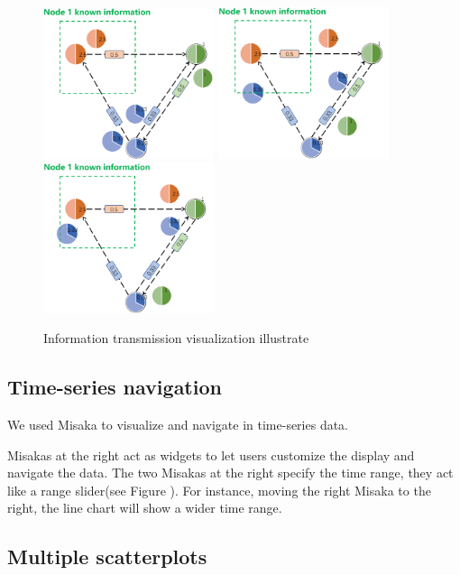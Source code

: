 \documentclass[conference]{IEEEtran}
\begin{document}
\begin{figure}[ht]
    \centering
    \includegraphics[width=5cm]{PPT1.png}
    \includegraphics[width=5cm]{PPT2.png}
    \includegraphics[width=5cm]{PPT3.png}
    \caption{Information transmission visualization illustrate}
\label{fig:PPT}
\end{figure}

\subsection{Time-series navigation}

We used Misaka to visualize and navigate in time-series data.

Misakas at the right act as widgets to let users customize the display and navigate the data. The two Misakas at the right specify the time range, they act like a range slider\cite{ahlberg1992dynamic}(see Figure ). For instance, moving the right Misaka to the right, the line chart will show a wider time range.


\subsection{Multiple scatterplots}
\end{document}
